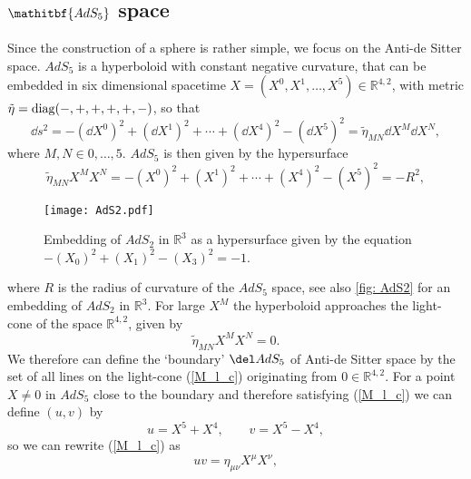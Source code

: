 \subsection[$AdS_{5}$ space]{$\mathitbf{AdS_{5}}$ space}\label{AdS5}
Since the construction of a sphere is rather simple, we focus on the Anti-de Sitter space. $AdS_{5}$ is a hyperboloid with constant negative curvature, that can be embedded in six dimensional  spacetime $X = (X^{0},X^{1},\ldots,X^{5}) \in \mathbb{R}^{4,2}$, with metric ${\tilde{\eta} = {\rm diag}(-,+,+,+,+,-)}$, so that
\begin{equation}
\dd s^{2} = -\left(\dd X^{0}\right)^{2} + \left(\dd X^{1}\right)^{2} + \cdots + \left(\dd X^{4}\right)^{2} - \left(\dd X^{5}\right)^{2} = \tilde{\eta}_{MN} \dd X^{M}\dd X^{N},
\end{equation}
where $M,N \in {0,\ldots,5}$. $AdS_{5}$ is then given by the hypersurface
\begin{equation}
\tilde{\eta}_{MN}X^{M}X^{N} = -\left(X^{0}\right)^{2} + \left(X^{1}\right)^{2} + \cdots + \left(X^{4}\right)^{2} - \left(X^{5}\right)^{2} = -R^{2},
\label{hyperbol}
\end{equation}
%
%
\begin{figure}[ht!]
\begin{center}
\texttt{[image: AdS2.pdf]}
\caption{Embedding of $AdS_{2}$ in $\mathbb{R}^{3}$ as a hypersurface given by the equation $-(X_{0})^{2}+(X_{1})^{2}-(X_{3})^{2}=-1$. \label{fig: AdS2}}
\end{center}
\end{figure}
%
%
where $R$ is the radius of curvature of the $AdS_{5}$ space, see also \autoref{fig: AdS2}  for an embedding of $AdS_{2}$ in $\mathbb{R}^{3}$. For large $X^{M}$ the hyperboloid approaches the light-cone of the  space $\mathbb{R}^{4,2}$, given by
\begin{equation}
\tilde{\eta}_{MN}X^{M}X^{N} = 0.
\label{M_l_c}
\end{equation}
We therefore can define the `boundary' $\del AdS_{5}$ of Anti-de Sitter space by the set of all lines on the light-cone (\ref{M_l_c}) originating from $0 \in \mathbb{R}^{4,2}$. For a point $X \neq 0$ in $AdS_{5}$ close to the boundary and therefore satisfying (\ref{M_l_c}) we can define $(u,v)$ by
\begin{equation}
u = X^{5}+X^{4}, \qquad v = X^{5}-X^{4},
\end{equation}
so we can rewrite (\ref{M_l_c}) as
\begin{equation}
uv = \eta_{\mu \nu} X^{\mu}X^{\nu},
\end{equation}
